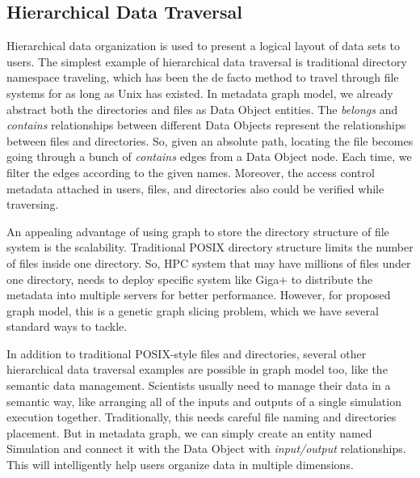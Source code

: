 \subsection{Hierarchical Data Traversal}
Hierarchical data organization is used to present a logical layout of data sets to users. The simplest example of hierarchical data traversal is traditional directory namespace traveling, which has been the de facto method to travel through file systems for as long as Unix has existed. In metadata graph model, we already abstract both the directories and files as Data Object entities. The \textit{belongs} and \textit{contains} relationships between different Data Objects represent the relationships between files and directories. So, given an absolute path, locating the file becomes going through a bunch of \textit{contains} edges from a Data Object node. Each time, we filter the edges according to the given names. Moreover, the access control metadata attached in users, files, and directories also could be verified while traversing. 


An appealing advantage of using graph to store the directory structure of file system is the scalability. Traditional POSIX directory structure limits the number of files inside one directory. So, HPC system that may have millions of files under one directory, needs to deploy specific system like Giga+ to distribute the metadata into multiple servers for better performance. However, for proposed graph model, this is a genetic graph slicing problem, which we have several standard ways to tackle.

In addition to traditional POSIX-style files and directories, several other hierarchical data traversal examples are possible in graph model too, like the semantic data management. Scientists usually need to manage their data in a semantic way, like arranging all of the inputs and outputs of a single simulation execution together. Traditionally, this needs careful file naming and directories placement. But in metadata graph, we can simply create an entity named Simulation and connect it with the Data Object with \textit{input/output} relationships. This will intelligently help users organize data in multiple dimensions.

